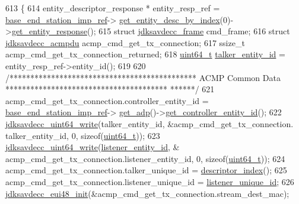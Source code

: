 \begin{DoxyCode}
613 \{
614     entity\_descriptor\_response * entity\_resp\_ref = \hyperlink{classavdecc__lib_1_1descriptor__base__imp_a550c969411f5f3b69f55cc139763d224}{base\_end\_station\_imp\_ref}->
      \hyperlink{classavdecc__lib_1_1end__station__imp_a2039add3a7eb753152149e07a86ad008}{get\_entity\_desc\_by\_index}(0)->\hyperlink{classavdecc__lib_1_1entity__descriptor_ac31dd117f0c931ae93c8ba52df7211bd}{get\_entity\_response}();
615     \textcolor{keyword}{struct }\hyperlink{structjdksavdecc__frame}{jdksavdecc\_frame} cmd\_frame;
616     \textcolor{keyword}{struct }\hyperlink{structjdksavdecc__acmpdu}{jdksavdecc\_acmpdu} acmp\_cmd\_get\_tx\_connection;
617     ssize\_t acmp\_cmd\_get\_tx\_connection\_returned;
618     \hyperlink{parse_8c_aec6fcb673ff035718c238c8c9d544c47}{uint64\_t} \hyperlink{structjdksavdecc__acmpdu_a5a263561481c86cc310ff078f7313b6d}{talker\_entity\_id} = entity\_resp\_ref->entity\_id();
619 
620     \textcolor{comment}{/********************************************* ACMP Common Data ***************************************
      ******/}
621     acmp\_cmd\_get\_tx\_connection.controller\_entity\_id = \hyperlink{classavdecc__lib_1_1descriptor__base__imp_a550c969411f5f3b69f55cc139763d224}{base\_end\_station\_imp\_ref}->
      \hyperlink{classavdecc__lib_1_1end__station__imp_a471a74540ce6182fad0c17dfd010107e}{get\_adp}()->\hyperlink{classavdecc__lib_1_1adp_a0c0959a46658c0a22e9530334b2912da}{get\_controller\_entity\_id}();
622     \hyperlink{group__endian_gaa294fd85c2d887032dad294c6833c903}{jdksavdecc\_uint64\_write}(talker\_entity\_id, &acmp\_cmd\_get\_tx\_connection.
      talker\_entity\_id, 0, \textcolor{keyword}{sizeof}(\hyperlink{parse_8c_aec6fcb673ff035718c238c8c9d544c47}{uint64\_t}));
623     \hyperlink{group__endian_gaa294fd85c2d887032dad294c6833c903}{jdksavdecc\_uint64\_write}(\hyperlink{structjdksavdecc__acmpdu_ae204d36de673d5135ef97cc19a344b37}{listener\_entity\_id}, &
      acmp\_cmd\_get\_tx\_connection.listener\_entity\_id, 0, \textcolor{keyword}{sizeof}(\hyperlink{parse_8c_aec6fcb673ff035718c238c8c9d544c47}{uint64\_t}));
624     acmp\_cmd\_get\_tx\_connection.talker\_unique\_id = \hyperlink{classavdecc__lib_1_1descriptor__base__imp_ac23c0a35276c07cfce8c8660700c2135}{descriptor\_index}();
625     acmp\_cmd\_get\_tx\_connection.listener\_unique\_id = \hyperlink{structjdksavdecc__acmpdu_a13c0b9c45a002c3c35ae4d85a3018c07}{listener\_unique\_id};
626     \hyperlink{group__eui48_gae0bd9d7b819e8314b425d7c8bbae2333}{jdksavdecc\_eui48\_init}(&acmp\_cmd\_get\_tx\_connection.stream\_dest\_mac);

\end{DoxyCode}
